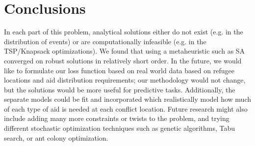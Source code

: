 \documentclass{article} %
\begin{document}
\section*{Conclusions}

In each part of this problem, analytical solutions either do not exist (e.g. in the distribution of events) or are computationally infeasible (e.g. in the TSP/Knapsack optimizations).  We found that using a metaheuristic such as SA converged on robust solutions in relatively short order. In the future, we would like to formulate our loss function based on real world data based on refugee locations and aid distribution requirements; our methodology would not change, but the solutions would be more useful for predictive tasks. Additionally, the separate models could be fit and incorporated which realistically model how much of each type of aid is needed at each conflict location. Future research might also include adding many more constraints or twists to the problem, and trying different stochastic optimization techniques such as genetic algorithms, Tabu search, or ant colony optimization.



\end{document}
